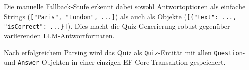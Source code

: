 Die manuelle Fallback-Stufe erkennt dabei sowohl Antwortoptionen als einfache Strings (\texttt{["Paris", "London", ...]}) als auch als Objekte (\texttt{[\{"text": ..., "isCorrect": ...\}]}). Dies macht die Quiz-Generierung robust gegen\"uber variierenden LLM-Antwortformaten.

Nach erfolgreichem Parsing wird das Quiz als \texttt{Quiz}-Entit\"at mit allen \texttt{Question}- und \texttt{Answer}-Objekten in einer einzigen EF Core-Transaktion gespeichert.
